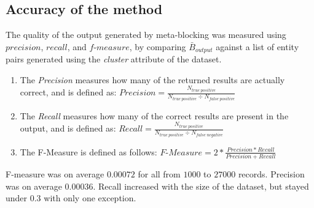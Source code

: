 \documentclass[a4paper,12pt]{article}
\begin{document}
\begin{center}
\end{center}

\newpage
\subsection{Accuracy of the method}
The quality of the output generated by meta-blocking was measured using $precision$, $recall$, and $f\text{-}measure$, by comparing $\bar B_{output}$ against a list of entity pairs generated using the \emph{cluster} attribute of the dataset.
\begin{enumerate}
  \item The \emph{Precision} measures how many of the returned results are actually correct, and is defined as: $Precision = \frac{N_{true\ positive}}{N_{true\ positive} \div N_{false\ positive}}$
  \item The \emph{Recall} measures how many of the correct results are present in the output, and is defined as: $Recall = \frac{N_{true\ positive}}{N_{true\ positive} \div N_{false\ negative}}$
  \item The F-Measure is defined as follows: $F\text{-}Measure = 2*\frac{Precision * Recall}{Precision + Recall}$
\end{enumerate}

F-measure was on average $0.00072$ for all from $1000$ to $27000$ records. Precision was on average $0.00036$. Recall increased with the size of the dataset, but stayed under $0.3$ with only one exception.

\begin{center}
\end{center}
\end{document}
